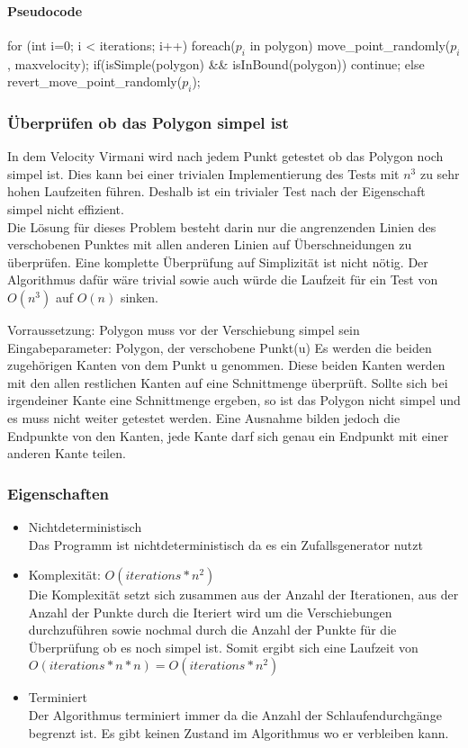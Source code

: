 \paragraph{Pseudocode}

\begin{code}[mathescape=true]
for (int i=0; i < iterations; i++)
{
	foreach($p_i$ in polygon)
	{
		move_point_randomly($p_i$, maxvelocity);
		if(isSimple(polygon) && isInBound(polygon))
			continue;
		else
			revert_move_point_randomly($p_i$);
	}
}
\end{code}

\subsubsection{Überprüfen ob das Polygon simpel ist}
In dem Velocity Virmani wird nach jedem Punkt getestet ob das Polygon noch simpel ist. Dies kann bei einer trivialen Implementierung des Tests mit $n^3$ zu sehr hohen Laufzeiten führen.
Deshalb ist ein trivialer Test nach der Eigenschaft simpel nicht effizient.\smallskip \\ 
Die Lösung für dieses Problem besteht darin nur die angrenzenden Linien des verschobenen Punktes mit allen anderen Linien auf Überschneidungen zu überprüfen. Eine komplette Überprüfung auf Simplizität ist nicht nötig.
Der Algorithmus dafür wäre trivial sowie auch würde die Laufzeit für ein Test von $O(n^3)$ auf $O(n)$ sinken.

Vorraussetzung: Polygon muss vor der Verschiebung simpel sein
Eingabeparameter: Polygon, der verschobene Punkt(u)
Es werden die beiden zugehörigen Kanten von dem Punkt u genommen. Diese beiden Kanten werden mit den allen restlichen Kanten auf eine Schnittmenge überprüft. Sollte sich bei irgendeiner Kante eine Schnittmenge ergeben, so ist das Polygon nicht simpel und es muss nicht weiter getestet werden. Eine Ausnahme bilden jedoch die Endpunkte von den Kanten, jede Kante darf sich genau ein Endpunkt mit einer anderen Kante teilen.


\subsubsection{Eigenschaften}
\begin{itemize}
	\item Nichtdeterministisch\\
	Das Programm ist nichtdeterministisch da es ein Zufallsgenerator nutzt
	\item Komplexität: $O(iterations*n^2)$\\
	Die Komplexität setzt sich zusammen aus der Anzahl der Iterationen, aus der Anzahl der Punkte durch die Iteriert wird um die Verschiebungen durchzuführen sowie nochmal durch die Anzahl der Punkte für die Überprüfung ob es noch simpel ist. Somit ergibt sich eine Laufzeit von $O(iterations*n*n) = O(iterations*n^2)$
	\item Terminiert\\
	Der Algorithmus terminiert immer da die Anzahl der Schlaufendurchgänge begrenzt ist. Es gibt keinen Zustand im Algorithmus wo er verbleiben kann.
\end{itemize}

